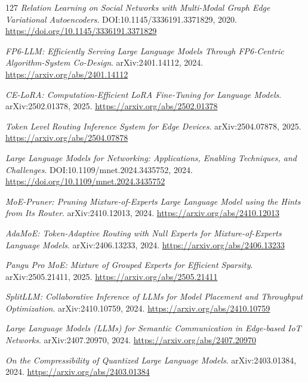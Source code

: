 \documentclass[11pt,a4paper]{article}
\begin{document}
\begin{thebibliography}{127}
\newblock \emph{Relation Learning on Social Networks with Multi-Modal Graph Edge Variational Autoencoders}.
\newblock DOI:10.1145/3336191.3371829, 2020.
\newblock \url{https://doi.org/10.1145/3336191.3371829}

\newblock \emph{FP6-LLM: Efficiently Serving Large Language Models Through FP6-Centric Algorithm-System Co-Design}.
\newblock arXiv:2401.14112, 2024.
\newblock \url{https://arxiv.org/abs/2401.14112}

\newblock \emph{CE-LoRA: Computation-Efficient LoRA Fine-Tuning for Language Models}.
\newblock arXiv:2502.01378, 2025.
\newblock \url{https://arxiv.org/abs/2502.01378}

\newblock \emph{Token Level Routing Inference System for Edge Devices}.
\newblock arXiv:2504.07878, 2025.
\newblock \url{https://arxiv.org/abs/2504.07878}

\newblock \emph{Large Language Models for Networking: Applications, Enabling Techniques, and Challenges}.
\newblock DOI:10.1109/mnet.2024.3435752, 2024.
\newblock \url{https://doi.org/10.1109/mnet.2024.3435752}

\newblock \emph{MoE-Pruner: Pruning Mixture-of-Experts Large Language Model using the Hints from Its Router}.
\newblock arXiv:2410.12013, 2024.
\newblock \url{https://arxiv.org/abs/2410.12013}

\newblock \emph{AdaMoE: Token-Adaptive Routing with Null Experts for Mixture-of-Experts Language Models}.
\newblock arXiv:2406.13233, 2024.
\newblock \url{https://arxiv.org/abs/2406.13233}

\newblock \emph{Pangu Pro MoE: Mixture of Grouped Experts for Efficient Sparsity}.
\newblock arXiv:2505.21411, 2025.
\newblock \url{https://arxiv.org/abs/2505.21411}

\newblock \emph{SplitLLM: Collaborative Inference of LLMs for Model Placement and Throughput Optimization}.
\newblock arXiv:2410.10759, 2024.
\newblock \url{https://arxiv.org/abs/2410.10759}

\newblock \emph{Large Language Models (LLMs) for Semantic Communication in Edge-based IoT Networks}.
\newblock arXiv:2407.20970, 2024.
\newblock \url{https://arxiv.org/abs/2407.20970}

\newblock \emph{On the Compressibility of Quantized Large Language Models}.
\newblock arXiv:2403.01384, 2024.
\newblock \url{https://arxiv.org/abs/2403.01384}


\end{thebibliography}
\end{document}
